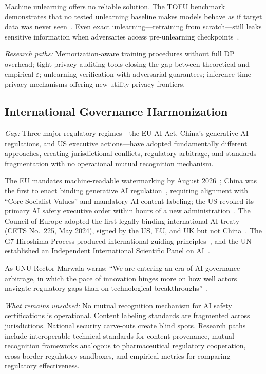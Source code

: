 Machine unlearning offers no reliable solution. The TOFU benchmark demonstrates that no tested unlearning baseline makes models behave as if target data was never seen~\cite{maini2024tofu}. Even exact unlearning---retraining from scratch---still leaks sensitive information when adversaries access pre-unlearning checkpoints~\cite{unlearned2025}.

\emph{Research paths:} Memorization-aware training procedures without full DP overhead; tight privacy auditing tools closing the gap between theoretical and empirical $\varepsilon$; unlearning verification with adversarial guarantees; inference-time privacy mechanisms offering new utility-privacy frontiers.


\subsection{International Governance Harmonization}
\label{sec:future-governance}

\emph{Gap:} Three major regulatory regimes---the EU AI Act, China's generative AI regulations, and US executive actions---have adopted fundamentally different approaches, creating jurisdictional conflicts, regulatory arbitrage, and standards fragmentation with no operational mutual recognition mechanism.

The EU mandates machine-readable watermarking by August 2026~\cite{euaiact2024}; China was the first to enact binding generative AI regulation~\cite{chinainterim2023}, requiring alignment with ``Core Socialist Values'' and mandatory AI content labeling; the US revoked its primary AI safety executive order within hours of a new administration~\cite{eo14179}. The Council of Europe adopted the first legally binding international AI treaty (CETS No.~225, May 2024), signed by the US, EU, and UK but not China~\cite{coe2024treaty}. The G7 Hiroshima Process produced international guiding principles~\cite{hiroshima2023}, and the UN established an Independent International Scientific Panel on AI~\cite{unga2025aipanel}.

As UNU Rector Marwala warns: ``We are entering an era of AI governance arbitrage, in which the pace of innovation hinges more on how well actors navigate regulatory gaps than on technological breakthroughs''~\cite{marwala2026arbitrage}.

\emph{What remains unsolved:} No mutual recognition mechanism for AI safety certifications is operational. Content labeling standards are fragmented across jurisdictions. National security carve-outs create blind spots. Research paths include interoperable technical standards for content provenance, mutual recognition frameworks analogous to pharmaceutical regulatory cooperation, cross-border regulatory sandboxes, and empirical metrics for comparing regulatory effectiveness.


